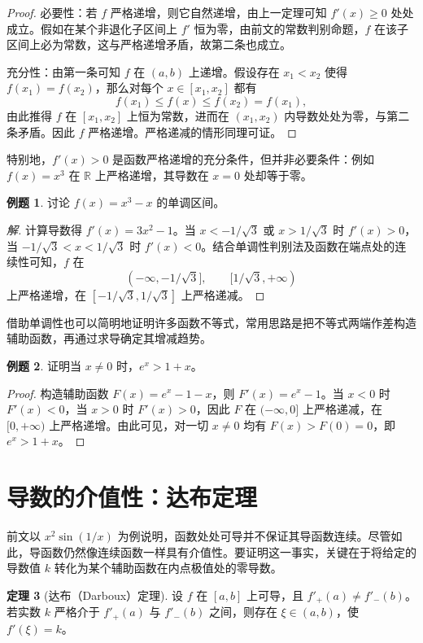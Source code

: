 \documentclass[UTF8,fontset=fandol,a4paper,12pt]{ctexart}
\newcommand{\R}{\mathbb R}
\theoremstyle{definition}
\newtheorem{theorem}{定理}[section]
\newtheorem{example}[theorem]{例题}
\begin{document}
\begin{proof}
必要性：若 $f$ 严格递增，则它自然递增，由上一定理可知 $f'(x)\ge0$ 处处成立。假如在某个非退化子区间上 $f'$ 恒为零，由前文的常数判别命题，$f$ 在该子区间上必为常数，这与严格递增矛盾，故第二条也成立。

充分性：由第一条可知 $f$ 在 $(a,b)$ 上递增。假设存在 $x_1<x_2$ 使得 $f(x_1)=f(x_2)$，那么对每个 $x\in[x_1,x_2]$ 都有
\[
 f(x_1)\le f(x)\le f(x_2)=f(x_1),
\]
由此推得 $f$ 在 $[x_1,x_2]$ 上恒为常数，进而在 $(x_1,x_2)$ 内导数处处为零，与第二条矛盾。因此 $f$ 严格递增。严格递减的情形同理可证。
\end{proof}

特别地，$f'(x)>0$ 是函数严格递增的充分条件，但并非必要条件：例如 $f(x)=x^3$ 在 $\R$ 上严格递增，其导数在 $x=0$ 处却等于零。

\begin{example}
讨论 $f(x)=x^3-x$ 的单调区间。
\end{example}

\begin{proof}[解]
计算导数得 $f'(x)=3x^2-1$。当 $x<-1/\sqrt3$ 或 $x>1/\sqrt3$ 时 $f'(x)>0$，当 $-1/\sqrt3<x<1/\sqrt3$ 时 $f'(x)<0$。结合单调性判别法及函数在端点处的连续性可知，$f$ 在
\[
 (-\infty,-1/\sqrt3],\qquad[1/\sqrt3,+\infty)
\]
上严格递增，在 $[-1/\sqrt3,1/\sqrt3]$ 上严格递减。
\end{proof}

借助单调性也可以简明地证明许多函数不等式，常用思路是把不等式两端作差构造辅助函数，再通过求导确定其增减趋势。

\begin{example}
证明当 $x\ne0$ 时，$e^x>1+x$。
\end{example}

\begin{proof}
构造辅助函数 $F(x)=e^x-1-x$，则 $F'(x)=e^x-1$。当 $x<0$ 时 $F'(x)<0$，当 $x>0$ 时 $F'(x)>0$，因此 $F$ 在 $(-\infty,0]$ 上严格递减，在 $[0,+\infty)$ 上严格递增。由此可见，对一切 $x\ne0$ 均有 $F(x)>F(0)=0$，即 $e^x>1+x$。
\end{proof}

\section{导数的介值性：达布定理}
前文以 $x^2\sin(1/x)$ 为例说明，函数处处可导并不保证其导函数连续。尽管如此，导函数仍然像连续函数一样具有介值性。要证明这一事实，关键在于将给定的导数值 $k$ 转化为某个辅助函数在内点极值处的零导数。

\begin{theorem}[达布（Darboux）定理]
设 $f$ 在 $[a,b]$ 上可导，且 $f'_+(a)\ne f'_-(b)$。若实数 $k$ 严格介于 $f'_+(a)$ 与 $f'_-(b)$ 之间，则存在 $\xi\in(a,b)$，使 $f'(\xi)=k$。
\end{theorem}
\end{document}
